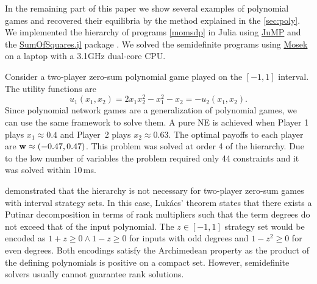 In the remaining part of this paper we show several examples of polynomial games and recovered their equilibria by the method explained in the \cref{sec:poly}. We implemented the hierarchy of programs \eqref{momsdp} in Julia using \href{https://jump.dev/}{JuMP} \cite{JuMP} and the \href{https://jump.dev/SumOfSquares.jl/stable/}{SumOfSquares.jl} package \cite{PolyJuMP}. We solved the semidefinite programs using \href{https://www.mosek.com/}{Mosek} on a laptop with a 3.1GHz dual-core CPU.

\begin{example}\label{ex:separable.parillo}
    Consider a two-player zero-sum polynomial game played on the $[-1,1]$ interval. The utility functions are
    \[
        u_{1}(x_{1},x_{2}) = 2x_{1}x_{2}^2 - x_{1}^2 - x_{2} = -u_{2}(x_{1},x_{2}).
    \]
    Since polynomial network games are a generalization of polynomial games, we can use the same framework to solve them. A pure NE is achieved when Player 1 plays $x_{1} \approx 0.4$ and Player~2 plays $x_{2} \approx 0.63$. The optimal payoffs to each player are $\mathbf{w} \approx (-0.47, 0.47)$. This problem was solved at order 4 of the hierarchy. Due to the low number of variables the problem required only 44 constraints and it was solved within 10\,ms.

    \textcite{parrilo:polynomial} demonstrated that the hierarchy is not necessary for two-player zero-sum games with interval strategy sets. In this case, Lukács' theorem \cite[1.21.1]{szego75orthogonal} states that there exists a Putinar decomposition in terms of rank multipliers such that the term degrees do not exceed that of the input polynomial. The $z\in[-1,1]$ strategy set would be encoded as $1+z \geq 0 \land 1-z \geq 0$ for inputs with odd degrees and $1-z^2 \geq 0$ for even degrees. Both encodings satisfy the Archimedean property as the product of the defining polynomials is positive on a compact set. However, semidefinite solvers usually cannot guarantee rank solutions.
\end{example}

